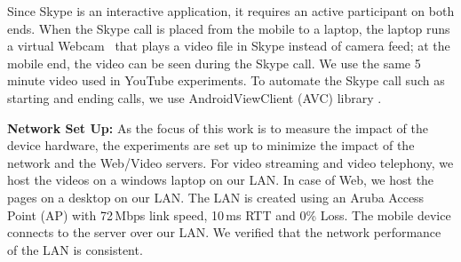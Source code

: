 Since Skype is an interactive application, it requires an active participant on both ends. When the Skype call is placed from the mobile to a laptop, the laptop runs a virtual Webcam~\cite{mancam} that plays a video file in Skype instead of camera feed; at the mobile end, the video can be seen during the Skype call. 
We use the same 5 minute video used in YouTube experiments. To automate the Skype call such as starting and ending calls, we use AndroidViewClient (AVC) library \cite{awc}. 

 





{\noindent \bf Network Set Up:}
As the focus of this work is to measure the impact of the device hardware, the 
experiments are set up to minimize the impact of the network and the Web/Video servers.
For video streaming and video telephony, we host the videos on a windows laptop on our LAN. 
In case of Web, we host the pages on a desktop on our LAN. The LAN is created using 
an Aruba Access Point (AP) with 72\,Mbps link speed, 10\,ms RTT and 0\% Loss. The mobile device connects to the server over our LAN. We verified that the network performance of the LAN is consistent.  

